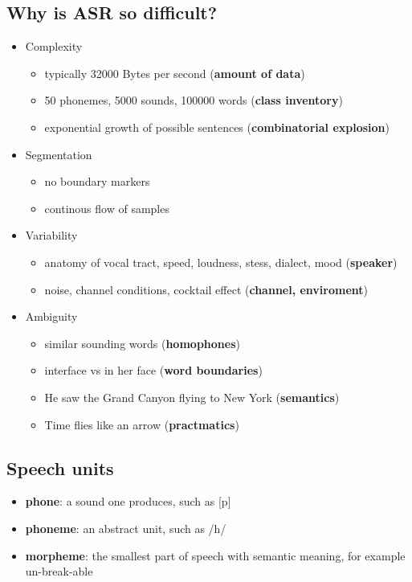 \documentclass[11pt]{article}
\begin{document}
\subsection{Why is ASR so difficult?}
\begin{itemize}
\item Complexity
\begin{itemize}
\item typically 32000 Bytes per second (\textbf{amount of data})
\item 50 phonemes, 5000 sounds, 100000 words (\textbf{class inventory})
\item exponential growth of possible sentences (\textbf{combinatorial explosion})
\end{itemize}

\item Segmentation
\begin{itemize}
\item no boundary markers 
\item continous flow of samples
\end{itemize}

\item Variability
\begin{itemize}
\item anatomy of vocal tract, speed, loudness, stess, dialect, mood (\textbf{speaker})
\item noise, channel conditions, cocktail effect (\textbf{channel, enviroment})
\end{itemize}

\item Ambiguity
\begin{itemize}
\item similar sounding words (\textbf{homophones})
\item interface vs in her face (\textbf{word boundaries})
\item He saw the Grand Canyon flying to New York (\textbf{semantics})
\item Time flies like an arrow (\textbf{practmatics})

\end{itemize}


\end{itemize}


\subsection{Speech units}

\begin{itemize}
    \item \textbf{phone}: a sound one produces, such as [p]
    \item \textbf{phoneme}: an abstract unit, such as /h/
    \item \textbf{morpheme}: the smallest part of speech with semantic meaning, for example un-break-able
\end{itemize}
\end{document}
